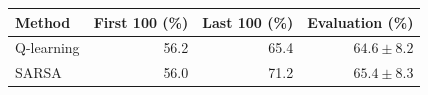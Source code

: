 \begin{tabular}{lrrr}
\toprule
Method & First 100 (\%) & Last 100 (\%) & Evaluation (\%) \\
\midrule
Q-learning & 56.2 & 65.4 & $64.6 \pm 8.2$ \\
SARSA & 56.0 & 71.2 & $65.4 \pm 8.3$ \\
\bottomrule
\end{tabular}
